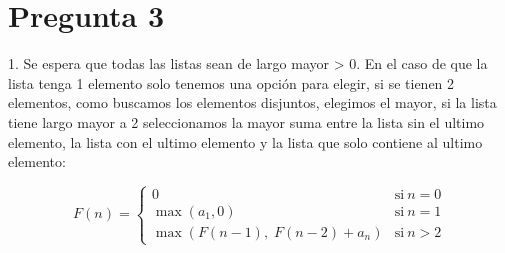 \documentclass[
	spanish, %
	letterpaper, oneside
]{article}
\begin{document}
\newpage
\section*{Pregunta 3}

1. Se espera que todas las listas sean de largo mayor > 0. En el caso de que la lista tenga 1 elemento solo tenemos una opción para elegir, si se tienen 2 elementos, como buscamos los elementos disjuntos, elegimos el mayor, si la lista tiene largo mayor a 2 seleccionamos la mayor suma entre la lista sin el ultimo elemento, la lista con el ultimo elemento y la lista que solo contiene al ultimo elemento:

\begin{equation}
    \label{eq:aqui-le-mostramos-como-hacerle-la-llave-grande}
    F(n) = \left\{
          \begin{array}{ll}
            0 & \mathrm{si\ } n = 0 \\
            \max(a_1,0) & \mathrm{si\ } n = 1 \\
            \max(F(n-1),\; F(n-2)+a_n) & \mathrm{si\ } n > 2
          \end{array}
        \right.
\end{equation}
\end{document}
